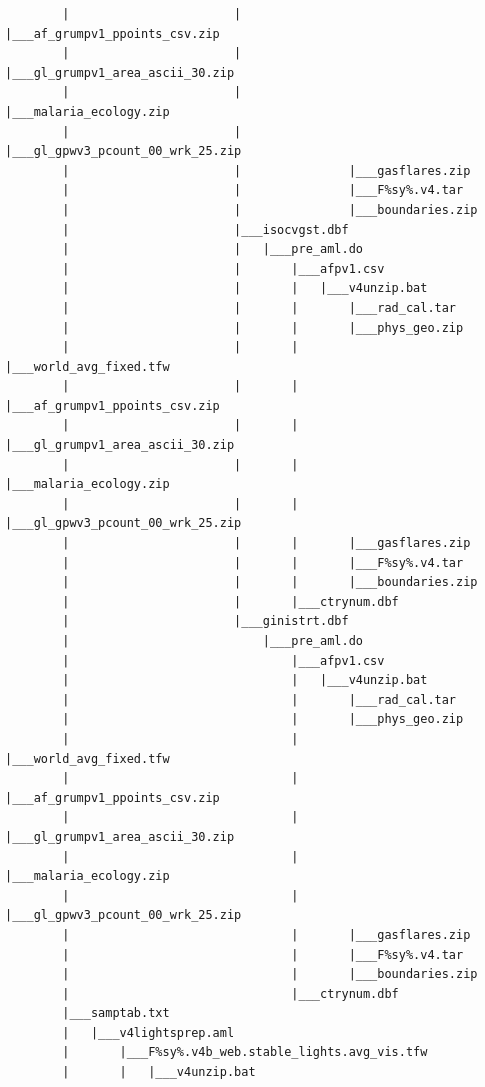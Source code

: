 \documentclass[]{book}
\begin{document}
\begin{verbatim}
        |                       |               |___af_grumpv1_ppoints_csv.zip
        |                       |               |___gl_grumpv1_area_ascii_30.zip
        |                       |               |___malaria_ecology.zip
        |                       |               |___gl_gpwv3_pcount_00_wrk_25.zip
        |                       |               |___gasflares.zip
        |                       |               |___F%sy%.v4.tar
        |                       |               |___boundaries.zip
        |                       |___isocvgst.dbf
        |                       |   |___pre_aml.do
        |                       |       |___afpv1.csv
        |                       |       |   |___v4unzip.bat
        |                       |       |       |___rad_cal.tar
        |                       |       |       |___phys_geo.zip
        |                       |       |       |___world_avg_fixed.tfw
        |                       |       |       |___af_grumpv1_ppoints_csv.zip
        |                       |       |       |___gl_grumpv1_area_ascii_30.zip
        |                       |       |       |___malaria_ecology.zip
        |                       |       |       |___gl_gpwv3_pcount_00_wrk_25.zip
        |                       |       |       |___gasflares.zip
        |                       |       |       |___F%sy%.v4.tar
        |                       |       |       |___boundaries.zip
        |                       |       |___ctrynum.dbf
        |                       |___ginistrt.dbf
        |                           |___pre_aml.do
        |                               |___afpv1.csv
        |                               |   |___v4unzip.bat
        |                               |       |___rad_cal.tar
        |                               |       |___phys_geo.zip
        |                               |       |___world_avg_fixed.tfw
        |                               |       |___af_grumpv1_ppoints_csv.zip
        |                               |       |___gl_grumpv1_area_ascii_30.zip
        |                               |       |___malaria_ecology.zip
        |                               |       |___gl_gpwv3_pcount_00_wrk_25.zip
        |                               |       |___gasflares.zip
        |                               |       |___F%sy%.v4.tar
        |                               |       |___boundaries.zip
        |                               |___ctrynum.dbf
        |___samptab.txt
        |   |___v4lightsprep.aml
        |       |___F%sy%.v4b_web.stable_lights.avg_vis.tfw
        |       |   |___v4unzip.bat

\end{verbatim}
\end{document}
